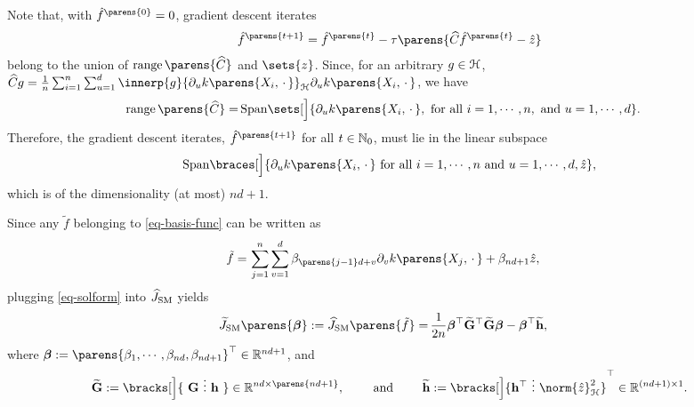 	Note that, with $\hat{f}^{\parens{0}} = 0$, gradient descent iterates 
	\begin{align*}
		\hat{f}^{\parens{t+1}} = \hat{f}^{\parens{t}} - \tau \parens{\widehat{C} \hat{f}^{\parens{t}} - \hat{z}}
	\end{align*}
	belong to the union of $\range \parens{\widehat{C}}$ and $\sets{z}$. Since, for an arbitrary $g \in \mathcal{H}$, $\widehat{C} g = \frac{1}{n} \sum_{i=1}^n \sum_{u=1}^d \innerp{g}{\partial_u k \parens{X_i, \,\cdot\,}}_{\calH} \partial_u k \parens{X_i, \,\cdot\,}$, we have 
	\begin{align*}%
		\range \parens{\widehat{C}} 
		= & \, \text{Span} \sets[\Big]{\partial_u k \parens{X_i, \,\cdot\,}, \text{ for all } i = 1, \cdots, n, \text{ and } u = 1, \cdots, d}. 
	\end{align*}
	Therefore, the gradient descent iterates, $\hat{f}^{\parens{t+1}}$ for all $t \in \mathbb{N}_0$, must lie in the linear subspace 
	\begin{align}\label{eq-basis-func}
		\text{Span} \braces[\Big]{\partial_u k \parens{X_i, \,\cdot\,} \text{ for all } i = 1, \cdots, n \text{ and } u = 1, \cdots, d, \hat{z}}, 
	\end{align}
	which is of the dimensionality (at most) $nd + 1$. 
	
	Since any $\tilde{f}$ belonging to \eqref{eq-basis-func} can be written as 
	\begin{align}\label{eq-solform}
		\tilde{f} = & \, \sum_{j=1}^n \sum_{v=1}^d \beta_{\parens{j-1}d+v} \partial_v k \parens{X_j, \,\cdot\,} + \beta_{nd+1} \hat{z}, 
	\end{align}
	plugging \eqref{eq-solform} into $\widehat{J}_{\mathrm{SM}}$ yields 
	\begin{align*}
		\widetilde{J}_{\SM} \parens{\bbeta} := \widehat{J}_{\SM} \parens{\tilde{f}} 
		= & \, \frac{1}{2n} \bbeta^\top \widetilde{\bG}^\top \widetilde{\bG} \bbeta - \bbeta^\top \widetilde{\bh}, 
	\end{align*}
	where $\bbeta := \parens{\beta_{1}, \cdots, \beta_{nd}, \beta_{nd+1}}^\top \in \Real^{nd+1}$, and 
	\begin{align*}
		\widetilde{\bG} := \bracks[\Big]{ \
			\bG \  \vdots \  \bh \ } \in \Real^{nd \times \parens{nd+1}}, \qquad \text{ and } \qquad \widetilde{\bh} := \bracks[\Big]{ \bh^\top \ \vdots \ \norm{\hat{z}}_{\calH}^2 }^\top \in \Real^{(nd+1) \times 1}. 
	\end{align*}
	
